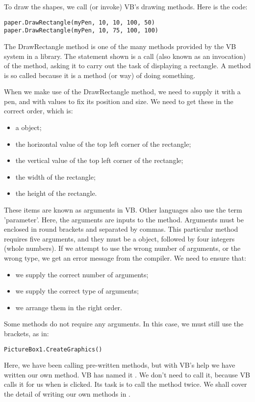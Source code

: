 		To draw the shapes, we call (or invoke) VB's drawing methods. Here is the code:
		\begin{lstlisting}
paper.DrawRectangle(myPen, 10, 10, 100, 50)
paper.DrawRectangle(myPen, 10, 75, 100, 100)
		\end{lstlisting}

		The DrawRectangle method is one of the many methods provided by the VB system in a library. The statement shown is a call (also known as an invocation) of the method, asking it to carry out the task of displaying a rectangle. A method is so called because it is a method (or way) of doing something.

		When we make use of the DrawRectangle method, we need to supply it with a pen, and with values to fix its position and size. We need to get these in the correct order, which is:
		\begin{itemize}
			\item a  object;
			\item the horizontal value of the top left corner of the rectangle;
			\item the vertical value of the top left corner of the rectangle;
			\item the width of the rectangle;
			\item the height of the rectangle.
		\end{itemize}
		These items are known as arguments in VB. Other languages also use the term 'parameter'. Here, the arguments are inputs to the  method. Arguments must be enclosed in round brackets and separated by commas. This particular method requires five arguments, and they must be a  object, followed by four integers (whole numbers). If we attempt to use the wrong number of arguments, or the wrong type, we get an error message from the compiler. We need to ensure that:
		\begin{itemize}
			\item we supply the correct number of arguments;
			\item we supply the correct type of arguments;
			\item we arrange them in the right order.
		\end{itemize}
		Some methods do not require any arguments. In this case, we must still use the brackets, as in:
		\begin{lstlisting}
PictureBox1.CreateGraphics()
		\end{lstlisting}

		Here, we have been calling pre-written methods, but with VB's help we have written our own method. VB has named it . We don't need to call it, because VB calls it for us when  is clicked. Its task is to call the  method twice. We shall cover the detail of writing our own methods in .

